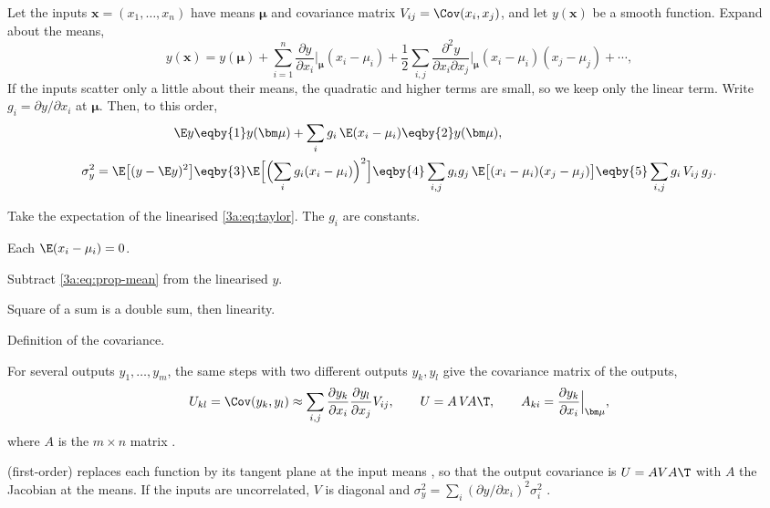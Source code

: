 Let the inputs $\bm x=(x_1,\dots,x_n)$ have means $\bm\mu$ and covariance
matrix $V_{ij}=\Cov(x_i,x_j)$, and let $y(\bm x)$ be a smooth function. Expand
about the means,
\begin{equation}
  y(\bm x)=y(\bm\mu)+\sum_{i=1}^n\frac{\partial y}{\partial x_i}\Big|_{\bm\mu}(x_i-\mu_i)
  +\frac12\sum_{i,j}\frac{\partial^2y}{\partial x_i\partial x_j}\Big|_{\bm\mu}(x_i-\mu_i)(x_j-\mu_j)+\cdots,
  \label{3a:eq:taylor}
\end{equation}
If the inputs scatter only a little about their means, the quadratic and
higher terms are small, so we keep only the linear term. Write
$g_i=\partial y/\partial x_i$ at $\bm\mu$. Then, to this order,
\begin{align}
  \E y &\eqby{1} y(\bm\mu)+\sum_ig_i\,\E(x_i-\mu_i) \eqby{2} y(\bm\mu),
  \label{3a:eq:prop-mean}\\
  \sigma_y^2=\E\bigl[(y-\E y)^2\bigr]
  &\eqby{3} \E\Bigl[\Bigl(\sum_ig_i(x_i-\mu_i)\Bigr)^2\Bigr]
   \eqby{4} \sum_{i,j}g_ig_j\,\E\bigl[(x_i-\mu_i)(x_j-\mu_j)\bigr]
   \eqby{5} \sum_{i,j}g_i\,V_{ij}\,g_j .
  \label{3a:eq:prop-var}
\end{align}
\begin{explain}
  \item Take the expectation of the linearised \eqref{3a:eq:taylor}. The $g_i$ are constants.
  \item Each $\E(x_i-\mu_i)=0$.
  \item Subtract \eqref{3a:eq:prop-mean} from the linearised $y$.
  \item Square of a sum is a double sum, then linearity.
  \item Definition of the covariance.
\end{explain}
For several outputs $y_1,\dots,y_m$, the same steps with two different
outputs $y_k,y_l$ give the covariance matrix of the outputs,
\begin{equation}
  U_{kl}=\Cov(y_k,y_l)\approx\sum_{i,j}\frac{\partial y_k}{\partial x_i}\frac{\partial y_l}{\partial x_j}V_{ij},
  \qquad
  U=A\,V\!A\T,\qquad A_{ki}=\frac{\partial y_k}{\partial x_i}\Big|_{\bm\mu},
  \label{3a:eq:prop-matrix}
\end{equation}
where $A$ is the $m\times n$  matrix
.

\begin{workdef}
 (first-order)  replaces each
function by its tangent plane at the input means , so that the output covariance is
$U=AVA\T$ with $A$ the Jacobian at the means. If the inputs are
uncorrelated, $V$ is diagonal and
$\sigma_y^2=\sum_i(\partial y/\partial x_i)^2\sigma_i^2$
.
\end{workdef}

